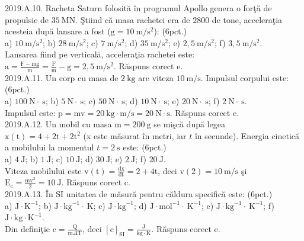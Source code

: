 2019.A.10. Racheta Saturn folosită în programul Apollo genera o forţă de propulsie de $35 \mathrm{~MN}$. Ştiind că masa rachetei era de $2800$ de tone, acceleraţia acesteia după lansare a fost ($\mathrm{g}=10 \mathrm{~m} / \mathrm{s}^{2}$): (6pct.)\\ a) $10 \mathrm{~m} / \mathrm{s}^{2}$; b) $28 \mathrm{~m} / \mathrm{s}^{2}$; c) $7 \mathrm{~m} / \mathrm{s}^{2}$; d) $35 \mathrm{~m} / \mathrm{s}^{2}$; e) $2,5 \mathrm{~m} / \mathrm{s}^{2}$; f) $3,5 \mathrm{~m} / \mathrm{s}^{2}$.\\ Lansarea fiind pe verticală, acceleraţia rachetei este:\\ $\mathrm{a}=\frac{\mathrm{F}-\mathrm{mg}}{\mathrm{m}}=\frac{\mathrm{F}}{\mathrm{m}}-\mathrm{g}=2,5 \mathrm{~m} / \mathrm{s}^{2}$. Răspuns corect e.\\

2019.A.11. Un corp cu masa de $2 \mathrm{~kg}$ are viteza $10 \mathrm{~m} / \mathrm{s}$. Impulsul corpului este: (6pct.)\\ a) $100 \mathrm{~N} \cdot \mathrm{~s}$; b) $5 \mathrm{~N} \cdot \mathrm{~s}$; c) $50 \mathrm{~N} \cdot \mathrm{~s}$; d) $10 \mathrm{~N} \cdot \mathrm{~s}$; e) $20 \mathrm{~N} \cdot \mathrm{~s}$; f) $2 \mathrm{~N} \cdot \mathrm{~s}$.\\ Impulsul este: $\mathrm{p}=\mathrm{mv}=20 \mathrm{~kg} \cdot \mathrm{m} / \mathrm{s}=20 \mathrm{~N} \cdot \mathrm{s}$. Răspuns corect e.\\

2019.A.12. Un mobil cu masa $\mathrm{m}=200 \mathrm{~g}$ se mişcă după legea $\mathrm{x}(\mathrm{t})=4+2 \mathrm{t}+2 \mathrm{t}^{2}$ (x este măsurat în metri, iar $t$ în secunde). Energia cinetică a mobilului la momentul $t=2 \mathrm{~s}$ este: (6pct.)\\ a) $4 \mathrm{~J}$; b) $1 \mathrm{~J}$; c) $10 \mathrm{~J}$; d) $30 \mathrm{~J}$; e) $2 \mathrm{~J}$; f) $20 \mathrm{~J}$.\\ Viteza mobilului este $\mathrm{v}(\mathrm{t})=\frac{\mathrm{dx}}{\mathrm{dt}}=2+4 \mathrm{t}$, deci $\mathrm{v}(2)=10 \mathrm{~m} / \mathrm{s}$ şi $\mathrm{E}_{\mathrm{c}}=\frac{\mathrm{mv}^{2}}{2}=10 \mathrm{~J}$. Răspuns corect c.\\

2019.A.13. În SI unitatea de măsură pentru căldura specifică este: (6pct.)\\ a) $\mathrm{J} \cdot \mathrm{K}^{-1}$; b) $\mathrm{J} \cdot \mathrm{kg}^{-1} \cdot \mathrm{~K}$; c) $\mathrm{J} \cdot \mathrm{kg}^{-1}$; d) $\mathrm{J} \cdot \mathrm{mol}^{-1} \cdot \mathrm{~K}^{-1}$; e) $\mathrm{J} \cdot \mathrm{kg}^{-1} \cdot \mathrm{~K}^{-1}$; f) $\mathrm{J} \cdot \mathrm{kg} \cdot \mathrm{K}^{-1}$.\\ Din definiţie $\mathrm{c}=\frac{\mathrm{Q}}{\mathrm{m} \Delta \mathrm{T}}$, deci $\left[\mathrm{c}\right]_{\mathrm{SI}}=\frac{\mathrm{J}}{\mathrm{kg} \cdot \mathrm{K}}$. Răspuns corect e.\\


